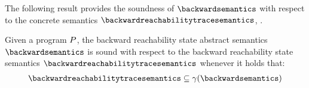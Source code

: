 The following result provides the soundness of $\backwardsemantics$ with respect to the concrete semantics $\backwardreachabilitytracesemantics$, \cf{} .

\begin{theorem}
  Given a program $P$, the backward reachability state abstract semantics $\backwardsemantics$ is sound with respect to the backward reachability state semantics $\backwardreachabilitytracesemantics$ whenever it holds that:
  \begin{align*}
    \backwardreachabilitytracesemantics \subseteq \abstractdomainconcretization(\backwardsemantics)
  \end{align*}
\end{theorem}
